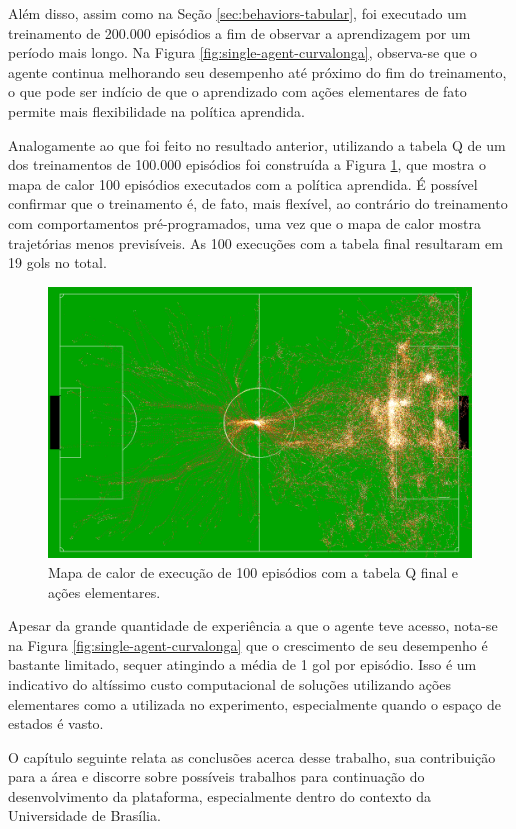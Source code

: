 Além disso, assim como na Seção \ref{sec:behaviors-tabular}, foi executado um treinamento de 200.000 episódios a fim de observar a aprendizagem por um período mais longo. Na Figura \ref{fig:single-agent-curvalonga}, observa-se que o agente continua melhorando seu desempenho até próximo do fim do treinamento, o que pode ser indício de que o aprendizado com ações elementares de fato permite mais flexibilidade na política aprendida.

Analogamente ao que foi feito no resultado anterior, utilizando a tabela Q de um dos treinamentos de 100.000 episódios foi construída a Figura \ref{fig:actionsheat}, que mostra o mapa de calor 100 episódios executados com a política aprendida. É possível confirmar que o treinamento é, de fato, mais flexível, ao contrário do treinamento com comportamentos pré-programados, uma vez que o mapa de calor mostra trajetórias menos previsíveis. As 100 execuções com a tabela final resultaram em 19 gols no total.

\begin{figure}[H]
	\includegraphics[width=0.9\linewidth]{figs/actionsheat.png}
	\centering
	\caption{Mapa de calor de execução de 100 episódios com a tabela Q final e ações elementares.}
	\label{fig:actionsheat}
\end{figure}

Apesar da grande quantidade de experiência a que o agente teve acesso, nota-se na Figura \ref{fig:single-agent-curvalonga} que o crescimento de seu desempenho é bastante limitado, sequer atingindo a média de 1 gol por episódio. Isso é um indicativo do altíssimo custo computacional de soluções utilizando ações elementares como a utilizada no experimento, especialmente quando o espaço de estados é vasto.

O capítulo seguinte relata as conclusões acerca desse trabalho, sua contribuição para a área e discorre sobre possíveis trabalhos para continuação do desenvolvimento da plataforma, especialmente dentro do contexto da Universidade de Brasília.

